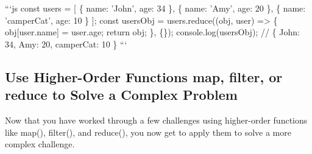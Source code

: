 \documentclass{article}%
\begin{document}
```js\newline%
const users = {[}\newline%
  \{ name: 'John', age: 34 \},\newline%
  \{ name: 'Amy', age: 20 \},\newline%
  \{ name: 'camperCat', age: 10 \}\newline%
{]};\newline%
const usersObj = users.reduce((obj, user) => \{\newline%
  obj{[}user.name{]} = user.age;\newline%
  return obj;\newline%
\}, \{\});\newline%
console.log(usersObj); // \{ John: 34, Amy: 20, camperCat: 10 \}\newline%
```\newline%

%
\subsection{Use Higher{-}Order Functions map, filter, or reduce to Solve a Complex Problem}%
\label{subsec:UseHigher{-}OrderFunctionsmap,filter,orreducetoSolveaComplexProblem}%
Now that you have worked through a few challenges using higher{-}order functions like map(), filter(), and reduce(), you now get to apply them to solve a more complex challenge.\newline%

%
\end{document}
